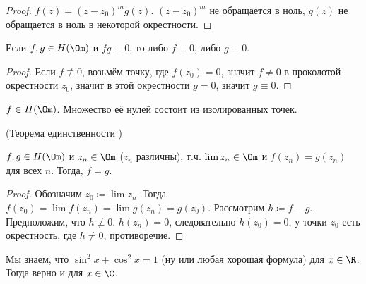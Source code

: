 \begin{proof}
    $f(z) = (z-z_0)^m g(z)$.
    $(z-z_0)^m$ не обращается в ноль,
    $g(z)$ не обращается в ноль в некоторой окрестности.
\end{proof}

\begin{consequence}
    Если $f, g \in H(\Om)$ и $fg \equiv 0$,
    то либо $f \equiv 0$, либо $g \equiv 0$.
\end{consequence}

\begin{proof}
    Если $f \not\equiv 0$, возьмём точку,
    где $f(z_0) = 0$, значит
    $f \ne 0$ в проколотой окрестности $z_0$,
    значит в этой окрестности $g = 0$,
    значит $g \equiv 0$.
\end{proof}

\begin{consequence}
    $f \in H(\Om)$.
    Множество её нулей состоит из изолированных точек.
\end{consequence}

\begin{theorem}
    (Теорема единственности )

    $f, g \in H(\Om)$
    и $z_n \in \Om$ ($z_n$ различны), т.ч.
    $\lim z_n \in \Om$
    и $f(z_n) = g(z_n)$ для всех $n$.
    Тогда, $f = g$.
\end{theorem}

\begin{proof}
    Обозначим $z_0 \coloneqq \lim z_n$.
    Тогда $f(z_0) = \lim f(z_n) = \lim g(z_n) = g(z_0)$.
    Рассмотрим $h \coloneqq f - g$.
    Предположим, что $h \not\equiv 0$.
    $h(z_n) = 0$, следовательно $h(z_0) = 0$,
    у точки $z_0$ есть окрестность, где $h \ne 0$,
    противоречие.
\end{proof}

\begin{consequence}
    Мы знаем, что $\sin^2 x + \cos^2 x = 1$
    (ну или любая хорошая формула)
    для $x \in \R$. Тогда верно и для $x \in \C$.
\end{consequence}